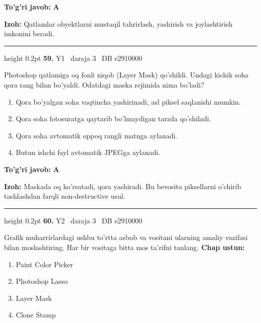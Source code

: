 \documentclass[10pt,a4paper,oneside]{article}
\begin{document}
\begin{tcolorbox}[enhanced,breakable,colback=teal!4,colframe=teal!45!black,boxrule=0.45pt,arc=1.2mm,left=2.8mm,right=2.8mm,top=2mm,bottom=2mm,before skip=2mm,after skip=2mm]
\textbf{\color{teal}To'g'ri javob:} \textbf{A}
\par\smallskip
\textbf{Izoh:} Qatlamlar obyektlarni mustaqil tahrirlash, yashirish va joylashtirish imkonini beradi.
\end{tcolorbox}
\vspace{2mm}\hrule height 0.2pt \vspace{4mm}
\hypertarget{q59}{\textbf{\color{ink}59.}}  {\color{muted}\scriptsize Y1 \textbullet\ daraja 3 \textbullet\ DB e2910000}
\par
Photoshop qatlamiga oq fonli niqob (Layer Mask) qo'shildi. Undagi kichik soha qora rang bilan bo'yaldi. Odatdagi maska rejimida nima bo'ladi?
\begin{enumerate}[label=\Alph*),leftmargin=9mm]
\item Qora bo'yalgan soha vaqtincha yashirinadi, asl piksel saqlanishi mumkin.
\item Qora soha fotosuratga qaytarib bo'lmaydigan tarzda qo'shiladi.
\item Qora soha avtomatik oppoq rangli matnga aylanadi.
\item Butun ishchi fayl avtomatik JPEGga aylanadi.
\end{enumerate}
\begin{tcolorbox}[enhanced,breakable,colback=teal!4,colframe=teal!45!black,boxrule=0.45pt,arc=1.2mm,left=2.8mm,right=2.8mm,top=2mm,bottom=2mm,before skip=2mm,after skip=2mm]
\textbf{\color{teal}To'g'ri javob:} \textbf{A}
\par\smallskip
\textbf{Izoh:} Maskada oq ko'rsatadi, qora yashiradi. Bu bevosita piksellarni o'chirib tashlashdan farqli non-destructive usul.
\end{tcolorbox}
\vspace{2mm}\hrule height 0.2pt \vspace{4mm}
\hypertarget{q60}{\textbf{\color{ink}60.}}  {\color{muted}\scriptsize Y2 \textbullet\ daraja 3 \textbullet\ DB e2910000}
\par
Grafik muharrirlardagi ushbu to'rtta asbob va vositani ularning amaliy vazifasi bilan moslashtiring. Har bir vositaga bitta mos ta'rifni tanlang.
\textbf{\footnotesize Chap ustun:}
\begin{enumerate}[label=\arabic*),leftmargin=9mm]
\item Paint Color Picker
\item Photoshop Lasso
\item Layer Mask
\item Clone Stamp
\end{enumerate}
\end{document}
